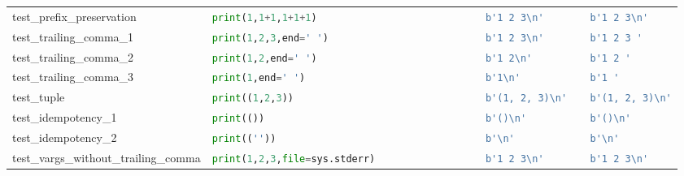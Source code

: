 \begin{table}[]
\begin{tabular}{@{}l|lll@{}}
    test\_prefix\_preservation            & \lstinline[language=Python, style=pythonstyle]|print(1,1+1,1+1+1)                           | & \lstinline[language=Python, style=pythonstyle]|b'1 2 3\n' |             & \lstinline[language=Python, style=pythonstyle]|b'1 2 3\n'    | \\
    test\_trailing\_comma\_1              & \lstinline[language=Python, style=pythonstyle]|print(1,2,3,end=' ')                         | & \lstinline[language=Python, style=pythonstyle]|b'1 2 3\n'  |            & \lstinline[language=Python, style=pythonstyle]|b'1 2 3 '     |                \\
    test\_trailing\_comma\_2              & \lstinline[language=Python, style=pythonstyle]|print(1,2,end=' ')                           | & \lstinline[language=Python, style=pythonstyle]|b'1 2\n'   |             & \lstinline[language=Python, style=pythonstyle]|b'1 2 '       |                \\
    test\_trailing\_comma\_3              & \lstinline[language=Python, style=pythonstyle]|print(1,end=' ')                             | & \lstinline[language=Python, style=pythonstyle]|b'1\n'  |                & \lstinline[language=Python, style=pythonstyle]|b'1 '         |                \\
    test\_tuple                           & \lstinline[language=Python, style=pythonstyle]|print((1,2,3))                               | & \lstinline[language=Python, style=pythonstyle]|b'(1, 2, 3)\n'  |        & \lstinline[language=Python, style=pythonstyle]|b'(1, 2, 3)\n'| \\
    test\_idempotency\_1                  & \lstinline[language=Python, style=pythonstyle]|print(())                                    | & \lstinline[language=Python, style=pythonstyle]|b'()\n'   |              & \lstinline[language=Python, style=pythonstyle]|b'()\n'       | \\
    test\_idempotency\_2                  & \lstinline[language=Python, style=pythonstyle]|print((''))                                  | & \lstinline[language=Python, style=pythonstyle]|b'\n' |                  & \lstinline[language=Python, style=pythonstyle]|b'\n'         | \\
    test\_vargs\_without\_trailing\_comma & \lstinline[language=Python, style=pythonstyle]|print(1,2,3,file=sys.stderr)                 | & \lstinline[language=Python, style=pythonstyle]|b'1 2 3\n'    |          & \lstinline[language=Python, style=pythonstyle]|b'1 2 3\n'    | \\

\end{tabular}
\end{table}
